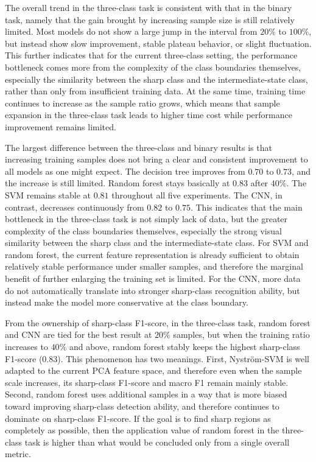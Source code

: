 \par The overall trend in the three-class task is consistent with that in the
binary task, namely that the gain brought by increasing sample size is still
relatively limited. Most models do not show a large jump in the interval from
$20\%$ to $100\%$, but instead show slow improvement, stable plateau behavior,
or slight fluctuation. This further indicates that for the current three-class
setting, the performance bottleneck comes more from the complexity of the class
boundaries themselves, especially the similarity between the sharp class and
the intermediate-state class, rather than only from insufficient training data.
At the same time, training time continues to increase as the sample ratio
grows, which means that sample expansion in the three-class task leads to
higher time cost while performance improvement remains limited.

\par The largest difference between the three-class and binary results is that
increasing training samples does not bring a clear and consistent improvement
to all models as one might expect. The decision tree improves from $0.70$ to
$0.73$, and the increase is still limited. Random forest stays basically at
$0.83$ after $40\%$. The SVM remains stable at $0.81$ throughout all five
experiments. The CNN, in contrast, decreases continuously from $0.82$ to
$0.75$. This indicates that the main bottleneck in the three-class task is not
simply lack of data, but the greater complexity of the class boundaries
themselves, especially the strong visual similarity between the sharp class and
the intermediate-state class. For SVM and random forest, the current feature
representation is already sufficient to obtain relatively stable performance
under smaller samples, and therefore the marginal benefit of further enlarging
the training set is limited. For the CNN, more data do not automatically
translate into stronger sharp-class recognition ability, but instead make the
model more conservative at the class boundary.

\par From the ownership of sharp-class F1-score, in the three-class task,
random forest and CNN are tied for the best result at $20\%$ samples, but when
the training ratio increases to $40\%$ and above, random forest stably keeps
the highest sharp-class F1-score ($0.83$). This phenomenon has two meanings.
First, Nystr\"{o}m-SVM is well adapted to the current PCA feature space, and
therefore even when the sample scale increases, its sharp-class F1-score and
macro F1 remain mainly stable. Second, random forest uses additional samples in
a way that is more biased toward improving sharp-class detection ability, and
therefore continues to dominate on sharp-class F1-score. If the goal is to
find sharp regions as completely as possible, then the application value of
random forest in the three-class task is higher than what would be concluded
only from a single overall metric.

